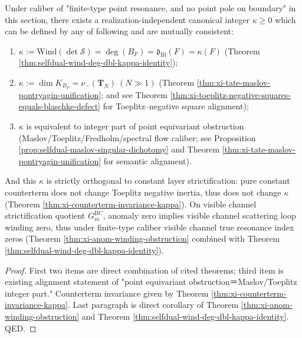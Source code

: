 \begin{corollary}\label{cor:xi-kappa-invariant-unification}
Under caliber of "finite-type point resonance, and no point pole on boundary" in this section, there exists a realization-independent canonical integer \(\kappa\ge 0\) which can be defined by any of following and are mutually consistent:
\begin{enumerate}
  \item \(\kappa:=\mathrm{Wind}(\det\mathcal S)=\deg(B_F)=\mathfrak d_{\mathrm{Bl}}(F)=\kappa(F)\) (Theorem \ref{thm:selfdual-wind-deg-dbl-kappa-identity});
  \item \(\kappa:=\dim K_{B_F}=\nu_-(\mathbf{T}_N)\ (N\gg 1)\) (Theorem \ref{thm:xi-tate-maslov-pontryagin-unification}; and see Theorem \ref{thm:xi-toeplitz-negative-squares-equals-blaschke-defect} for Toeplitz–negative square alignment);
  \item \(\kappa\) is equivalent to integer part of point equivariant obstruction (Maslov/Toeplitz/Fredholm/spectral flow caliber; see Proposition \ref{prop:selfdual-maslov-singular-dichotomy} and Theorem \ref{thm:xi-tate-maslov-pontryagin-unification} for semantic alignment).
\end{enumerate}
And this \(\kappa\) is strictly orthogonal to constant layer strictification: pure constant counterterm does not change Toeplitz negative inertia, thus does not change \(\kappa\) (Theorem \ref{thm:xi-counterterm-invariance-kappa}).
On visible channel strictification quotient \(G^{\mathrm{BC}}_m\), anomaly zero implies visible channel scattering loop winding zero, thus under finite-type caliber visible channel true resonance index zeros (Theorem \ref{thm:xi-anom-winding-obstruction} combined with Theorem \ref{thm:selfdual-wind-deg-dbl-kappa-identity}).
\end{corollary}
\begin{proof}
First two items are direct combination of cited theorems; third item is existing alignment statement of "point equivariant obstruction＝Maslov/Toeplitz integer part."
Counterterm invariance given by Theorem \ref{thm:xi-counterterm-invariance-kappa}.
Last paragraph is direct corollary of Theorem \ref{thm:xi-anom-winding-obstruction} and Theorem \ref{thm:selfdual-wind-deg-dbl-kappa-identity}. QED.
\end{proof}

